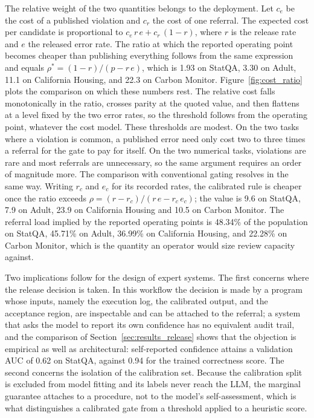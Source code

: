 \documentclass[preprint,12pt,authoryear]{elsarticle}
\begin{document}
The relative weight of the two quantities belongs to the deployment.
Let $c_e$ be the cost of a published violation and $c_r$ the cost of one referral.
The expected cost per candidate is proportional to $c_e\,r\,e + c_r\,(1-r)$, where $r$ is the release rate and $e$ the released error rate.
The ratio at which the reported operating point becomes cheaper than publishing everything follows from the same expression and equals $\rho^{\ast}=(1-r)/(p-r\,e)$, which is 1.93 on StatQA, 3.30 on Adult, 11.1 on California Housing, and 22.3 on Carbon Monitor.
Figure~\ref{fig:cost_ratio} plots the comparison on which these numbers rest.
The relative cost falls monotonically in the ratio, crosses parity at the quoted value, and then flattens at a level fixed by the two error rates, so the threshold follows from the operating point, whatever the cost model.
These thresholds are modest.
On the two tasks where a violation is common, a published error need only cost two to three times a referral for the gate to pay for itself.
On the two numerical tasks, violations are rare and most referrals are unnecessary, so the same argument requires an order of magnitude more.
The comparison with conventional gating resolves in the same way.
Writing $r_c$ and $e_c$ for its recorded rates, the calibrated rule is cheaper once the ratio exceeds $\rho=(r-r_c)/(r\,e-r_c\,e_c)$; the value is 9.6 on StatQA, 7.9 on Adult, 23.9 on California Housing and 10.5 on Carbon Monitor.
The referral load implied by the reported operating points is 48.34\% of the population on StatQA, 45.71\% on Adult, 36.99\% on California Housing, and 22.28\% on Carbon Monitor, which is the quantity an operator would size review capacity against.

Two implications follow for the design of expert systems.
The first concerns where the release decision is taken.
In this workflow the decision is made by a program whose inputs, namely the execution log, the calibrated output, and the acceptance region, are inspectable and can be attached to the referral; a system that asks the model to report its own confidence has no equivalent audit trail, and the comparison of Section~\ref{sec:results_release} shows that the objection is empirical as well as architectural: self-reported confidence attains a validation AUC of 0.62 on StatQA, against 0.94 for the trained correctness score.
The second concerns the isolation of the calibration set.
Because the calibration split is excluded from model fitting and its labels never reach the LLM, the marginal guarantee attaches to a procedure, not to the model's self-assessment, which is what distinguishes a calibrated gate from a threshold applied to a heuristic score.
\end{document}
